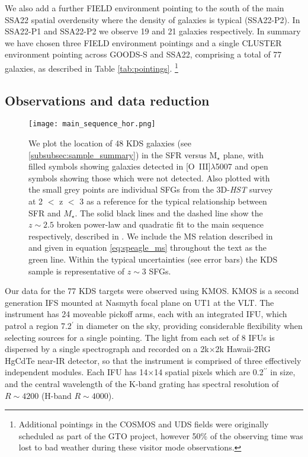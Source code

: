 \documentclass[fleqn,usenatbib]{mn2e}
\begin{document}
We also add a further FIELD environment pointing to the south of the main SSA22 spatial overdensity where the density of galaxies is typical (SSA22-P2).
In SSA22-P1 and SSA22-P2 we observe 19 and 21 galaxies respectively.
In summary we have chosen three FIELD environment pointings and a single CLUSTER environment pointing across GOODS-S and SSA22, comprising a total of 77 galaxies, as described in Table \ref{tab:pointings}. \footnote{Additional pointings in the COSMOS and UDS fields were originally scheduled as part of the GTO project, however 50$\%$ of the observing time was lost to bad weather during these visitor mode observations.}

\subsection{Observations and data reduction}\label{subsubsec:observations_and_dr}

\begin{figure*}
\centering
\texttt{[image: main\_sequence\_hor.png]}
\caption{We plot the location of 48 KDS galaxies (see \cref{subsubsec:sample_summary}) in the SFR versus M$_{\star}$ plane, with filled symbols showing galaxies detected in [O~{\sc III}]$\lambda$5007 and open symbols showing those which were not detected. 
Also plotted with the small grey points are individual SFGs from the 3D-{\em HST} survey  \protect\citep{Brammer2012,Momcheva2016} at 2 $<$ z $<$ 3 as a reference for the typical relationship between SFR and $M_{\star}$.
The solid black lines and the dashed line show the $z\sim2.5$ broken power-law and quadratic fit to the main sequence respectively, described in \protect\cite{Whitaker2014}.
We include the MS relation described in \protect\cite{Speagle2014} and given in equation \protect\ref{eq:speagle_ms} throughout the text as the green line. 
Within the typical uncertainties (see error bars) the KDS sample is representative of $z\sim3$ SFGs.}
\label{fig:main_sequence}
\end{figure*}

Our data for the 77 KDS targets were observed using KMOS.
KMOS is a second generation IFS mounted at Nasmyth focal plane on UT1 at the VLT.
The instrument has 24 moveable pickoff arms, each with an integrated IFU, which patrol a region 7.2$^{\prime}$ in diameter on the sky, providing considerable flexibility when selecting sources for a single pointing.
The light from each set of 8 IFUs is dispersed by a single spectrograph and recorded on a 2k$\times$2k Hawaii-2RG HgCdTe near-IR detector, so that the instrument is comprised of three effectively independent modules.
Each IFU has 14$\times$14 spatial pixels which are 0.2$^{\prime\prime}$ in size, and the central wavelength of the K-band grating has spectral resolution of $R \sim 4200$ (H-band $R \sim 4000$).
\end{document}
